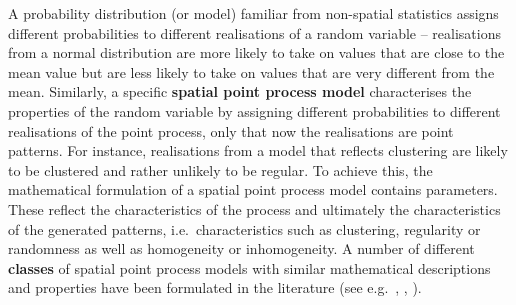 A probability distribution (or model) familiar from non-spatial statistics assigns different probabilities to different realisations of a random variable -- realisations from a normal distribution are more likely to take on values that are close to the mean value but are less likely to take on values that are very different from the mean.  
Similarly, a specific \textbf{spatial point process model} characterises the properties of the random variable by assigning different probabilities to different realisations of the point process, only that now the realisations are point patterns. For instance, realisations from a model that reflects clustering are likely to be clustered and rather unlikely to be regular.  To achieve this, the mathematical formulation of a spatial point process model contains parameters.  These reflect the characteristics of the process and ultimately the characteristics of the generated patterns, i.e.\ characteristics such as clustering, regularity or randomness as well as homogeneity or inhomogeneity.  A number of different \textbf{classes} of spatial point process models with similar mathematical descriptions and properties have been formulated in the literature (see e.g.\ \cite{lieshout:00}, \cite{moeller:03}, \cite{stoystoy:94}).





